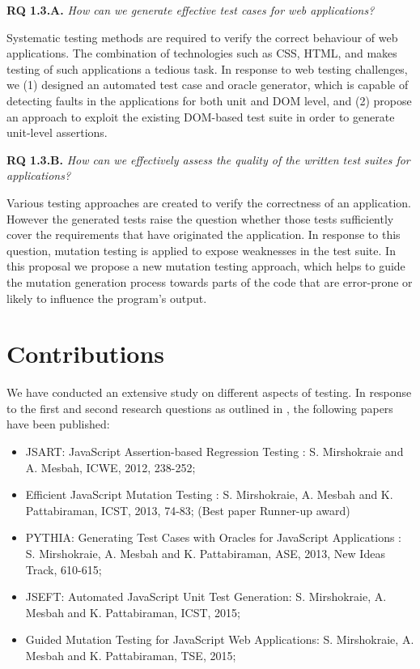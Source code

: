 {\bf RQ 1.3.A.} \emph{How can we generate effective test cases for \javascript web applications?}

Systematic testing methods are required to verify the correct behaviour of web applications. The combination of technologies such as CSS, HTML, and \javascript makes testing of such applications a tedious task.
In response to web testing challenges, we (1) designed an automated test case and oracle generator, which is capable of detecting faults
in the \javascript applications for both unit and DOM level, and (2) propose an approach to exploit the existing DOM-based test suite in order to generate unit-level assertions. 

{\bf RQ 1.3.B.} \emph{How can we effectively assess the quality of the written test suites for \javascript applications?}

Various testing approaches are created to verify the correctness of an application. However the generated tests raise the question whether those tests sufficiently cover the requirements that have originated the application.  In response to this question, mutation testing is applied to expose weaknesses in the test suite.
In this proposal we propose a new \javascript mutation testing approach, which helps to guide the
mutation generation process towards parts of the code that are error-prone or likely to influence the program's
output.

\section{Contributions} \label{Sec:contrib}
We have conducted an
extensive study on different aspects of \javascript testing. In response to the first and second research questions as outlined in , the following papers have been published:
\begin{itemize} [noitemsep, nolistsep]
\item JSART: JavaScript Assertion-based Regression Testing \cite{mirshokraie:icwe12}:
S. Mirshokraie and A. Mesbah, ICWE, 2012, 238-252;
\item Efficient JavaScript Mutation Testing \cite{mirshokraie:icst13}:
S. Mirshokraie, A. Mesbah and K. Pattabiraman, ICST, 2013, 74-83; (Best paper Runner-up award)
\item PYTHIA: Generating Test Cases with Oracles
for JavaScript Applications \cite{shabnam:ase13}: 
S. Mirshokraie, A. Mesbah and K. Pattabiraman, ASE, 2013, New Ideas Track, 610-615;
\item JSEFT: Automated JavaScript Unit Test Generation:
S. Mirshokraie, A. Mesbah and K. Pattabiraman, ICST, 2015;
\item Guided Mutation Testing for JavaScript Web Applications:
S. Mirshokraie, A. Mesbah and K. Pattabiraman, TSE, 2015;
\end{itemize}

